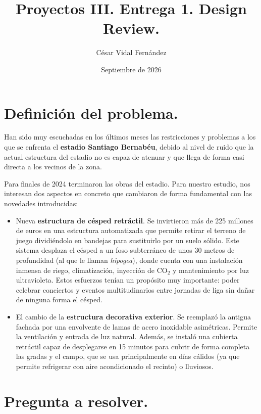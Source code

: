 \documentclass[10.5pt]{article}
\title{Proyectos III. Entrega 1. Design Review.}
\author{César Vidal Fernández}
\date{Septiembre de 2026}
\begin{document}
	
	\renewcommand{\contentsname}{Contenido.}
	
	\maketitle    
	\newpage
	
	\tableofcontents
	\newpage
	
	\section{Definición del problema.}
	
	Han sido muy escuchadas en los últimos meses las restricciones y problemas a los que se enfrenta el \textbf{estadio Santiago Bernabéu}, debido al nivel de ruido que la actual estructura del estadio no es capaz de atenuar y que llega de forma casi directa a los vecinos de la zona.
	
	Para finales de 2024 terminaron las obras del estadio. Para nuestro estudio, nos interesan dos aspectos en concreto que cambiaron de forma fundamental con las novedades introducidas:
	
	\begin{itemize}
		\item Nueva \textbf{estructura de césped retráctil}. Se invirtieron más de 225 millones de euros en una estructura automatizada que permite retirar el terreno de juego dividiéndolo en bandejas para sustituirlo por un suelo sólido. Este sistema desplaza el césped a un foso subterráneo de unos 30 metros de profundidad (al que le llaman \textit{hipogea}), donde cuenta con una instalación inmensa de riego, climatización, inyección de $\text{CO}_2$ y mantenimiento por luz ultravioleta. Estos esfuerzos tenían un propósito muy importante: poder celebrar conciertos y eventos multitudinarios entre jornadas de liga sin dañar de ninguna forma el césped.
		
		\item El cambio de la \textbf{estructura decorativa exterior}. Se reemplazó la antigua fachada por una envolvente de lamas de acero inoxidable asimétricas. Permite la ventilación y entrada de luz natural. Además, se instaló una cubierta retráctil capaz de desplegarse en 15 minutos para cubrir de forma completa las gradas y el campo, que se usa principalmente en días cálidos (ya que permite refrigerar con aire acondicionado el recinto) o lluviosos.
	\end{itemize}
	
	\section{Pregunta a resolver.}
	
\end{document}

